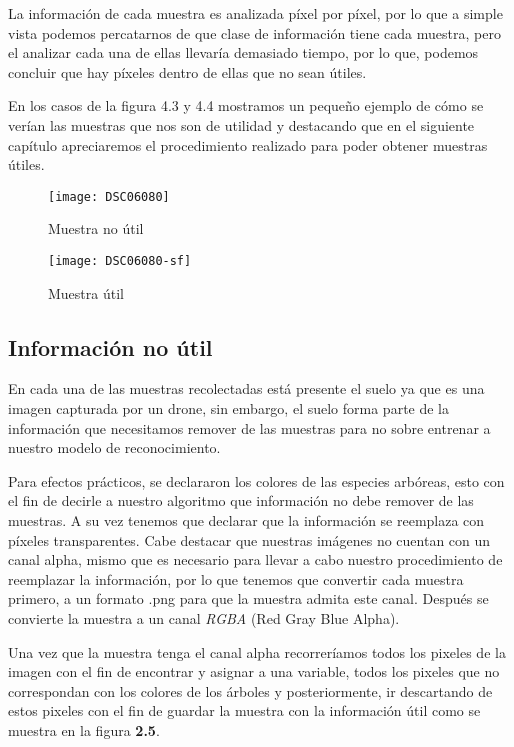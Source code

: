 La información de cada muestra es analizada píxel por píxel, por lo que a simple vista podemos percatarnos de que clase de información tiene cada muestra, pero el analizar cada una de ellas llevaría demasiado tiempo, por lo que, podemos concluir que hay píxeles dentro de ellas que no sean útiles. 

En los casos de la figura 4.3 y 4.4 mostramos un pequeño ejemplo de cómo se verían las muestras que nos son de utilidad y destacando que en el siguiente capítulo apreciaremos el procedimiento realizado para poder obtener muestras útiles.

\begin{figure}[b]
  \centering
  \begin{minipage}[b]{0.4\textwidth}
    \texttt{[image: DSC06080]}
    \caption{Muestra no útil}
  \end{minipage}
  \hfill
  \begin{minipage}[b]{0.4\textwidth}
    \texttt{[image: DSC06080-sf]}
    \caption{Muestra útil}
  \end{minipage}
\end{figure}

\newpage

\subsection{Información no útil}
En cada una de las muestras recolectadas está presente el suelo ya que es una imagen capturada por un drone, sin embargo, el suelo forma parte de la información que necesitamos remover de las muestras para no sobre entrenar a nuestro modelo de reconocimiento.

Para efectos prácticos, se declararon los colores de las especies arbóreas, esto con el fin de decirle a nuestro algoritmo que información no debe remover de las muestras. A su vez tenemos que declarar que la información se reemplaza con píxeles transparentes. Cabe destacar que nuestras imágenes no cuentan con un canal alpha, mismo que es necesario para llevar a cabo nuestro procedimiento de reemplazar la información, por lo que tenemos que convertir cada muestra primero, a un formato .png para que la muestra admita este canal. Después se convierte la muestra a un canal \emph{RGBA} (Red Gray Blue Alpha).

 Una vez que la muestra tenga el canal alpha recorreríamos todos los pixeles de la imagen con el fin de encontrar y asignar a una variable, todos los pixeles que no correspondan con los colores de los árboles y posteriormente, ir descartando de estos pixeles con el fin de guardar la muestra con la información útil como se muestra en la figura \textbf{2.5}.

